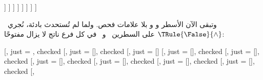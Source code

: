 \documentclass[../../../include/open-logic-section]{subfiles}
\begin{document}
{\begin{ex}
\begin{oltableau}
              [\pFmla{\True}{p}{\OLClassicalDigits{1}.\OLClassicalDigits{1}}, 
                just = {\TRule{\True}{\Diamond}[\OLClassicalDigits{4}]}, checked
                [\pFmla{\True}{q}{\OLClassicalDigits{1}.\OLClassicalDigits{2}}, 
                  just = {\TRule{\True}{\Diamond}[\OLClassicalDigits{5}]}, checked
                  [\pFmla{\False}{p \land q}{\OLClassicalDigits{1}.\OLClassicalDigits{1}}, 
                    just = {\TRule{\False}{\Diamond}[\OLClassicalDigits{3}]}
                    [\pFmla{\False}{p \land q}{\OLClassicalDigits{1}.\OLClassicalDigits{2}}, 
                      just = {\TRule{\False}{\Diamond}[\OLClassicalDigits{3}]}
                    ]
                  ]
                ]
              ]
            ]
          ]
        ]
      ]
    ]
  \end{oltableau}
  وتبقى الآن الأسطر  و و بلا علامات فحص. ولما لم تُستحدث بادئة،
  نُجري~$\TRule{\False}{\land}$ على السطرين~ و~ في كل فرع
  ناتج لا يزال مفتوحًا:
  \begin{oltableau}
    [,
      just = \TAss, checked
      [,
        just = {\TRule{\False}{\lif}[]}, checked
        [,
          just = {\TRule{\False}{\lif}[]}
          [,
            just = {\TRule{\True}{\land}[]}, checked
            [,
              just = {\TRule{\True}{\land}[]}, checked
              [, 
                just = {\TRule{\True}{\Diamond}[]}, checked
                [, 
                  just = {\TRule{\True}{\Diamond}[]}, checked
                  [, 
                    just = {\TRule{\False}{\Diamond}[]}, checked
                    [, 
                      just = {\TRule{\False}{\Diamond}[]}, checked
                      [,

\end{oltableau}
\end{ex}}
\end{document}
